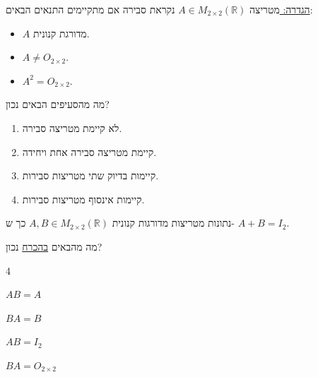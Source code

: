 \documentclass[12pt, a4paper]{article}
\newcommand{\rr}{\mathbb{R}}
\begin{document}
\begin{enumerate}
\fi

\underline{
הגדרה:
}
מטריצה $A\in M_{2\times 2}(\rr)$
נקראת סבירה אם מתקיימים התנאים הבאים:
\begin{itemize}
    \item $A$ מדורגת קנונית.
    \item $A\neq O_{2\times 2}$.
    \item $A^2 = O_{2\times 2}$.
\end{itemize}
מה מהסעיפים הבאים נכון?
\begin{enumerate}
    \item לא קיימת מטריצה סבירה.
    \item קיימת מטריצה סבירה אחת ויחידה.
    \item קיימות בדיוק שתי מטריצות סבירות.
    \item קיימות אינסוף מטריצות סבירות.
\end{enumerate}


נתונות מטריצות מדורגות קנונית
$A,B\in M_{2\times 2}(\rr)$ כך ש- $A+B=I_2$.

מה מהבאים 
\underline{בהכרח}
נכון?
\begin{enumerate}
\begin{multicols}{4}
    \item $AB=A$
    \item $BA=B$
    \item $AB=I_2$
    \item $BA=O_{2\times 2}$
\end{multicols}
\end{enumerate}

\end{enumerate}
\end{document}
